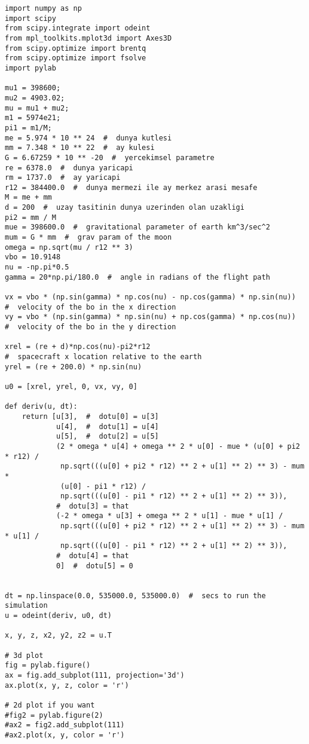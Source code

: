 \documentclass[12pt,fleqn]{article}\usepackage{../../common}
\begin{document}
\begin{verbatim}
import numpy as np
import scipy
from scipy.integrate import odeint
from mpl_toolkits.mplot3d import Axes3D
from scipy.optimize import brentq
from scipy.optimize import fsolve
import pylab

mu1 = 398600;
mu2 = 4903.02;
mu = mu1 + mu2;
m1 = 5974e21;
pi1 = m1/M;
me = 5.974 * 10 ** 24  #  dunya kutlesi
mm = 7.348 * 10 ** 22  #  ay kulesi
G = 6.67259 * 10 ** -20  #  yercekimsel parametre
re = 6378.0  #  dunya yaricapi
rm = 1737.0  #  ay yaricapi
r12 = 384400.0  #  dunya mermezi ile ay merkez arasi mesafe
M = me + mm
d = 200  #  uzay tasitinin dunya uzerinden olan uzakligi
pi2 = mm / M
mue = 398600.0  #  gravitational parameter of earth km^3/sec^2
mum = G * mm  #  grav param of the moon
omega = np.sqrt(mu / r12 ** 3)
vbo = 10.9148
nu = -np.pi*0.5
gamma = 20*np.pi/180.0  #  angle in radians of the flight path

vx = vbo * (np.sin(gamma) * np.cos(nu) - np.cos(gamma) * np.sin(nu))
#  velocity of the bo in the x direction
vy = vbo * (np.sin(gamma) * np.sin(nu) + np.cos(gamma) * np.cos(nu))
#  velocity of the bo in the y direction

xrel = (re + d)*np.cos(nu)-pi2*r12
#  spacecraft x location relative to the earth
yrel = (re + 200.0) * np.sin(nu)

u0 = [xrel, yrel, 0, vx, vy, 0]

def deriv(u, dt):
    return [u[3],  #  dotu[0] = u[3]
            u[4],  #  dotu[1] = u[4]
            u[5],  #  dotu[2] = u[5]
            (2 * omega * u[4] + omega ** 2 * u[0] - mue * (u[0] + pi2 * r12) /
             np.sqrt(((u[0] + pi2 * r12) ** 2 + u[1] ** 2) ** 3) - mum *
             (u[0] - pi1 * r12) /
             np.sqrt(((u[0] - pi1 * r12) ** 2 + u[1] ** 2) ** 3)),
            #  dotu[3] = that
            (-2 * omega * u[3] + omega ** 2 * u[1] - mue * u[1] /
             np.sqrt(((u[0] + pi2 * r12) ** 2 + u[1] ** 2) ** 3) - mum * u[1] /
             np.sqrt(((u[0] - pi1 * r12) ** 2 + u[1] ** 2) ** 3)),
            #  dotu[4] = that
            0]  #  dotu[5] = 0


dt = np.linspace(0.0, 535000.0, 535000.0)  #  secs to run the simulation
u = odeint(deriv, u0, dt)

x, y, z, x2, y2, z2 = u.T

# 3d plot
fig = pylab.figure()
ax = fig.add_subplot(111, projection='3d')
ax.plot(x, y, z, color = 'r')

# 2d plot if you want
#fig2 = pylab.figure(2)
#ax2 = fig2.add_subplot(111)
#ax2.plot(x, y, color = 'r')


\end{verbatim}
\end{document}
